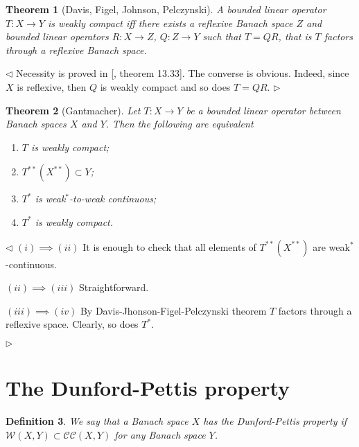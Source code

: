 \documentclass[12pt]{article}
\newtheorem{theorem}{Theorem}[section]
\newtheorem{definition}[theorem]{Definition}
\newenvironment{proof}{\par $\triangleleft$}{$\triangleright$}
\begin{document}
\begin{theorem}[Davis, Figel, Johnson, Pelczynski] A bounded linear operator
    $T:X\to Y$ is weakly compact iff there exists a reflexive Banach space $Z$
    and bounded linear operators $R:X\to Z$, $Q:Z\to Y$ such that $T=QR$, that
    is $T$ factors through a reflexive Banach space.
\end{theorem}
\begin{proof} Necessity is proved in [\cite{FabHabBanSpTh}, theorem 13.33]. The
    converse is obvious. Indeed, since $X$ is reflexive, then $Q$ is weakly
    compact and so does $T=QR$.
\end{proof}

\begin{theorem}[Gantmacher] Let $T:X\to Y$ be a bounded linear operator between
    Banach spaces $X$ and $Y$. Then the following are equivalent

    \begin{enumerate}[label = (\roman*)]
        \item $T$ is weakly compact;

        \item $T^{**}(X^{**})\subset Y$;

        \item $T^*$ is weak${}^*$-to-weak continuous;

        \item $T^*$ is weakly compact.
    \end{enumerate}
\end{theorem}
\begin{proof} $(i)\implies (ii)$ It is enough to check that all elements of
    $T^{**}(X^{**})$ are weak${}^*$-continuous.

    $(ii)\implies (iii)$ Straightforward.

    $(iii)\implies (iv)$ By Davis-Jhonson-Figel-Pelczynski theorem $T$ factors
    through a reflexive space. Clearly, so does $T^*$.


\end{proof}

\section{The Dunford-Pettis property}

\begin{definition}
    We say that a Banach space $X$ has the Dunford-Pettis property if
    $\mathcal{W}(X,Y)\subset \mathcal{CC}(X,Y)$ for any Banach space $Y$.
\end{definition}
\end{document}
